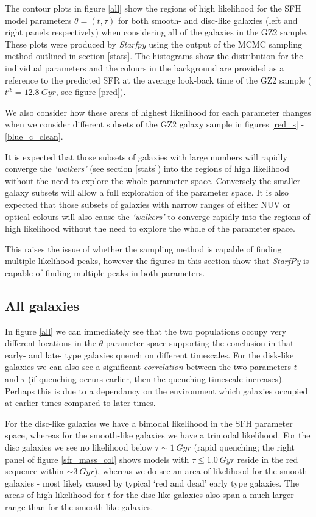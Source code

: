 \documentclass{mn2e}
\begin{document}
The contour plots in figure \ref{all} show the regions of high likelihood for the SFH model parameters $\theta = (t, \tau)$ for both smooth- and disc-like galaxies (left and right panels respectively) when considering all of the galaxies in the GZ2 sample. These plots were produced by \emph{Starfpy} using the output of the MCMC sampling method outlined in section \ref{stats}. The histograms show the distribution for the individual parameters and the colours in the background are provided as a reference to the predicted SFR at the average look-back time of the GZ2 sample ($t^{lb}=12.8~Gyr$, see figure \ref{pred}). 

We also consider how these areas of highest likelihood for each parameter changes when we consider different subsets of the GZ2 galaxy sample in figures \ref{red_s} - \ref{blue_c_clean}.

It is expected that those subsets of galaxies with large numbers will rapidly converge the \emph{`walkers'} (see section \ref{stats}) into the regions of high likelihood without the need to explore the whole parameter space. Conversely the smaller galaxy subsets will allow a full exploration of the parameter space. It is also expected that those subsets of galaxies with narrow ranges of either NUV or optical colours will also cause the \emph{`walkers'} to converge rapidly into the regions of high likelihood without the need to explore the whole of the parameter space.


This raises the issue of whether the sampling method is capable of finding multiple likelihood peaks, however the figures in this section show that \emph{StarfPy} is capable of finding multiple peaks in both parameters. 

\subsection{All galaxies}

In figure \ref{all} we can immediately see that the two populations occupy very different locations in the $\theta$ parameter space supporting the conclusion in \citet{Sch2014} that early- and late- type galaxies quench on different timescales. For the disk-like galaxies we can also see a significant \emph{correlation} between the two parameters $t$ and $\tau$ (if quenching occurs earlier, then the quenching timescale increases). Perhaps this is due to a dependancy on the environment which galaxies occupied at earlier times compared to later times. 

For the disc-like galaxies we have a bimodal likelihood in the SFH parameter space, whereas for the smooth-like galaxies we have a trimodal likelihood. For the disc galaxies we see no likelihood below $\tau \sim 1~Gyr$ (rapid quenching; the right panel of figure \ref{sfr_mass_col} shows models with $\tau \leq 1.0~Gyr$ reside in the red sequence within $\sim 3~Gyr$), whereas we do see an area of likelihood for the smooth galaxies - most likely caused by typical `red and dead' early type galaxies. The areas of high likelihood for $t$ for the disc-like galaxies also span a much larger range than for the smooth-like galaxies.
\end{document}
